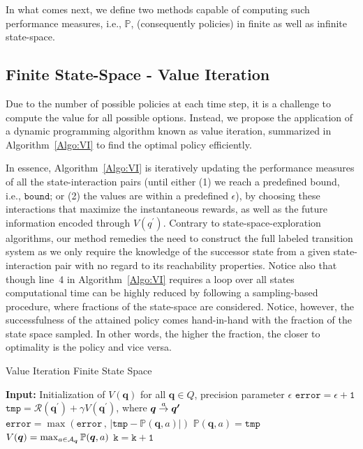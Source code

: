 In what comes next, we define two methods capable of computing such performance measures, i.e., $\mathbb{P}$,  (consequently policies) in finite as well as infinite state-space. 

\subsection{Finite State-Space - Value Iteration}
Due to the number of possible policies at each time step, it is a challenge to compute the value for all possible options. Instead, we propose the application of a dynamic programming algorithm known as value iteration, summarized in Algorithm~\ref{Algo:VI} to find the optimal policy efficiently. 

In essence, Algorithm~\ref{Algo:VI} is iteratively updating the performance measures of all the state-interaction pairs (until either (1) we reach a predefined bound, i.e., $\mathtt{bound}$; or (2) the values are within a predefined $\epsilon$),  by choosing these interactions that maximize the instantaneous rewards, as well as the future information encoded through $V(q^{\prime})$. 
Contrary to state-space-exploration algorithms, our method remedies the need to construct the full labeled transition system as we only require the knowledge of the successor state from a given state-interaction pair with no regard to its reachability properties. Notice also that though line~4 in Algorithm~\ref{Algo:VI} requires a loop over all states computational time can be highly reduced by following a sampling-based procedure, where fractions of the state-space are considered. Notice, however, the successfulness of the attained policy comes hand-in-hand with the fraction of the state space sampled. In other words, the higher the fraction, the closer to optimality is the policy and vice versa. 

\begin{algorithm}[h]
\caption{Value Iteration Finite State Space}
\label{Algo:VI}
\begin{algorithmic}[1]
\STATE \textbf{Input:} Initialization of $V( \bm{q})$ for all $ \bm{q}\in Q$, precision parameter $\epsilon$
\STATE $\mathtt{error = \epsilon + 1} $
			\STATE $\mathtt{tmp} = \mathcal{R}( \bm{q^{\prime}}) + \gamma V( \bm{q^{\prime}})$, where $ \bm{q} \goesto[a] \bm{q^{\prime}}$
		\STATE $\mathtt{error} =\max(\mathtt{error}\, , \, |\mathtt{tmp} - \mathbb{P}( \bm{q}, a)|)$
			\STATE $\mathbb{P}( \bm{q}, a) = \mathtt{tmp}$
		\ENDFOR
	\STATE $V( \bm{q}) =  \max_{a \in {\cal A}_{\bm{q}}} \mathbb{P}(\bm{q}, a)$
	\ENDFOR
	\STATE $\mathtt{k = k + 1}$
\ENDWHILE
\end{algorithmic}
\end{algorithm}

